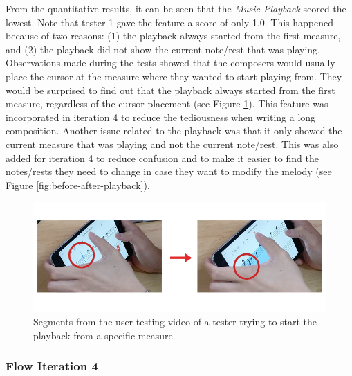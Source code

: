 				From the quantitative results, it can be seen that the \textit{Music Playback} scored the lowest. Note that tester 1 gave the feature a score of only 1.0. This happened because of two reasons: (1) the playback always started from the first measure, and (2) the playback did not show the current note/rest that was playing. Observations made during the tests showed that the composers would usually place the cursor at the measure where they wanted to start playing from. They would be surprised to find out that the playback always started from the first measure, regardless of the cursor placement (see Figure \ref{fig:video_musicplayback}). This feature was incorporated in iteration 4 to reduce the tediousness when writing a long composition. Another issue related to the playback was that it only showed the current measure that was playing and not the current note/rest. This was also added for iteration 4 to reduce confusion and to make it easier to find the notes/rests they need to change in case they want to modify the melody (see Figure \ref{fig:before-after-playback}). 

				\begin{figure}[H]
					\centering
					\includegraphics[scale=0.5]{figures/video_musicplayback.png}
				    \caption{Segments from the user testing video of a tester trying to start the playback from a specific measure.}
				    \label{fig:video_musicplayback}
				\end{figure}

			\subsubsection{Flow Iteration 4} %
			\label{sub:iteration_4}

